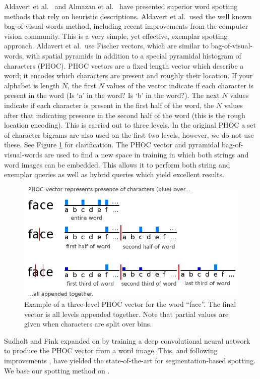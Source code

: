 \documentclass[ms,electronic,twosidetoc,letterpaper,chaptercenter,parttop,lof,lot]{byumsphd}
\begin{document}
Aldavert et al.~\cite{Aldavert2015} and Almazan et al.~\cite{Almazan2014} have presented superior word spotting methods that rely on heuristic descriptions. Aldavert et al.~used the well known bag-of-visual-words method, including recent improvements from the computer vision community. This is a very simple, yet effective, exemplar spotting approach. Aldavert et al.~use Fischer vectors, which are similar to bag-of-visual-words, with spatial pyramids in addition to a special pyramidal histogram of characters (PHOC).
PHOC vectors are a fixed length vector which describe a word; it encodes which characters are present and roughly their location. If your alphabet is length $N$, the first $N$ values of the vector indicate if each character is present in the word (Is `a' in the word? Is `b' in the word?). The next $N$ values indicate if each character is present in the first half of the word, the $N$ values after that indicating presence in the second half of the word (this is the rough location encoding). This is carried out to three levels. In the original PHOC a set of character bigrams are also used on the first two levels, however, we do not use these. See Figure \ref{fig:phoc} for clarification.
The PHOC vector and pyramidal bag-of-visual-words are used to find a new space in training in which both strings and word images can be embedded. This allows it to perform both string and exemplar queries as well as hybrid queries which yield excellent results.

\begin{figure}[t]
    \centering
    \includegraphics[width=.65\textwidth]{phoc}
    \caption{Example of a three-level PHOC vector for the word ``face''. The final vector is all levels appended together. Note that partial values are given when characters are split over bins.}
    \label{fig:phoc}
\end{figure}

Sudholt and Fink \cite{sudholt2016,sudholt2017} expanded on \cite{Almazan2014} by training a deep convolutional neural network to produce the PHOC vector from a word image. This, and following improvements \cite{krishnan2016, retsinasTrans2017}, have yielded the state-of-the-art for segmentation-based spotting. We base our spotting method on \cite{sudholt2017}.
\end{document}
